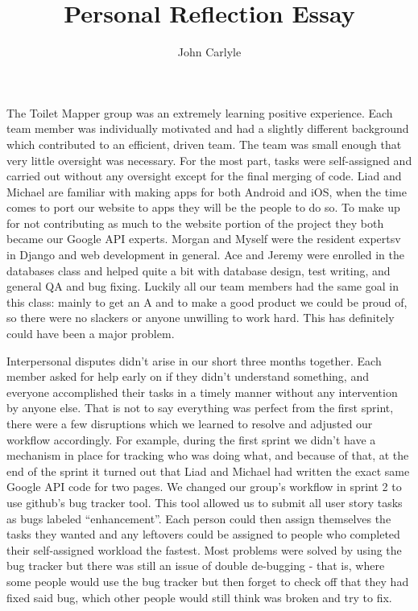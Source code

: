 \documentclass{article}
\title{Personal Reflection Essay}
\author{John Carlyle}
\begin{document}
\maketitle
\par
The Toilet Mapper group was an extremely learning positive experience.
Each team member was individually motivated and had a slightly different background which contributed to an efficient, driven team.
The team was small enough that very little oversight was necessary.
For the most part, tasks were self-assigned and carried out without any oversight except for the final merging of code.
Liad and Michael are familiar with making apps for both Android and iOS, when the time comes to port our website to apps they will be the people to do so.
To make up for not contributing as much to the website portion of the project they both became our Google API experts.
Morgan and Myself were the resident expertsv in Django and web development in general.
Ace and Jeremy were enrolled in the databases class and helped quite a bit with database design, test writing, and general QA and bug fixing.
Luckily all our team members had the same goal in this class: mainly to get an A and to make a good product we could be proud of, so there were no slackers or anyone unwilling to work hard. This has definitely could have been a major problem.
\par
Interpersonal disputes didn’t arise in our short three months together.
Each member asked for help early on if they didn’t understand something, and everyone accomplished their tasks in a timely manner without any intervention by anyone else.
That is not to say everything was perfect from the first sprint, there were a few disruptions which we learned to resolve and adjusted our workflow accordingly.
For example, during the first sprint we didn't have a mechanism in place for tracking who was doing what, and because of that, at the end of the sprint it turned out that Liad and Michael had written the exact same Google API code for two pages.
We changed our group’s workflow in sprint 2 to use github’s bug tracker tool.
This tool allowed us to submit all user story tasks as bugs labeled “enhancement”.
Each person could then assign themselves the tasks they wanted and any leftovers could be assigned to people who completed their self-assigned workload the fastest.
Most problems were solved by using the bug tracker but there was still an issue of double de-bugging - that is, where some people would use the bug tracker but then forget to check off that they had fixed said bug, which other people would still think was broken and try to fix.
\end{document}
